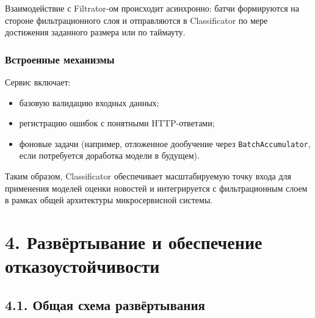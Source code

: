Взаимодействие с Filtrator-ом происходит асинхронно: батчи формируются
на стороне фильтрационного слоя и отправляются в Classificator по мере
достижения заданного размера или по таймауту.

\hypertarget{ux432ux441ux442ux440ux43eux435ux43dux43dux44bux435-ux43cux435ux445ux430ux43dux438ux437ux43cux44b}{%
\subsubsection{\texorpdfstring{\textbf{Встроенные
механизмы}}{Встроенные механизмы}}\label{ux432ux441ux442ux440ux43eux435ux43dux43dux44bux435-ux43cux435ux445ux430ux43dux438ux437ux43cux44b}}

Сервис включает:

\begin{itemize}
\tightlist
\item
  базовую валидацию входных данных;\\
\item
  регистрацию ошибок с понятными HTTP-ответами;\\
\item
  фоновые задачи (например, отложенное дообучение через
  \texttt{BatchAccumulator}, если потребуется доработка модели в
  будущем).
\end{itemize}

Таким образом, Classificator обеспечивает масштабируемую точку входа для
применения моделей оценки новостей и интегрируется с фильтрационным
слоем в рамках общей архитектуры микросервисной системы.

\hypertarget{ux440ux430ux437ux432ux451ux440ux442ux44bux432ux430ux43dux438ux435-ux438-ux43eux431ux435ux441ux43fux435ux447ux435ux43dux438ux435-ux43eux442ux43aux430ux437ux43eux443ux441ux442ux43eux439ux447ux438ux432ux43eux441ux442ux438}{%
\section{4. Развёртывание и обеспечение
отказоустойчивости}\label{ux440ux430ux437ux432ux451ux440ux442ux44bux432ux430ux43dux438ux435-ux438-ux43eux431ux435ux441ux43fux435ux447ux435ux43dux438ux435-ux43eux442ux43aux430ux437ux43eux443ux441ux442ux43eux439ux447ux438ux432ux43eux441ux442ux438}}

\hypertarget{ux43eux431ux449ux430ux44f-ux441ux445ux435ux43cux430-ux440ux430ux437ux432ux451ux440ux442ux44bux432ux430ux43dux438ux44f}{%
\subsection{4.1. Общая схема
развёртывания}\label{ux43eux431ux449ux430ux44f-ux441ux445ux435ux43cux430-ux440ux430ux437ux432ux451ux440ux442ux44bux432ux430ux43dux438ux44f}}


